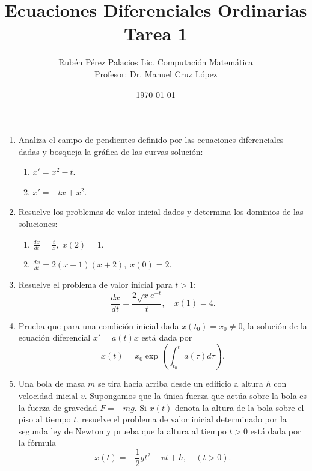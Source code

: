 \documentclass[letterpaper]{article}
\title{Ecuaciones Diferenciales Ordinarias \\ Tarea 1}
\author{Rubén Pérez Palacios Lic. Computación Matemática\\Profesor: Dr. Manuel Cruz López}
\date{\today}
\theoremstyle{definition}
\theoremstyle{lemathm}
\theoremstyle{lemathm}
\theoremstyle{lemathm}
\theoremstyle{lemademthm}
\newcommand{\1}{\mathbbm{1}}
\begin{document}
	\maketitle

	\begin{enumerate}

		\item Analiza el campo de pendientes definido por las ecuaciones diferenciales dadas y bosqueja la gr\'afica de las curvas soluci\'on:
		
		\begin{enumerate}

			\item $x'=x^2-t$.
			
			\item $x'=-tx+x^2$.
			
		\end{enumerate}
		
		\item Resuelve los problemas de valor inicial dados y determina los dominios de las soluciones:
		
		\begin{enumerate}

			\item $\displaystyle{\frac{dx}{dt}=\frac{t}{x}}, \; x(2)=1$.
			
			\item $\displaystyle{\frac{dx}{dt}=2(x-1)(x+2)}, \; x(0)=2$.
			
		\end{enumerate}
		
		\item Resuelve el problema de valor inicial para $t>1$:
		\[ \frac{dx}{dt} = \frac{2\sqrt{x}e^{-t}}{t},\quad x(1)=4. \]
		
		\item Prueba que para una condici\'on inicial dada $x(t_0)=x_0\neq 0$, la soluci\'on de la ecuaci\'on diferencial $x'=a(t)x$ est\'a dada por
		\[ x(t) = x_0\exp\left( \int_{t_0}^t a(\tau)d\tau \right). \]
		
		
		\item Una bola de masa $m$ se tira hacia arriba desde un edificio a altura $h$ con velocidad inicial $v$. Supongamos que la \'unica fuerza que act\'ua sobre la bola es la fuerza de gravedad $F=-mg$. Si $x(t)$ denota la altura de la bola sobre el piso al tiempo $t$, resuelve el problema de valor inicial determinado por la segunda ley de Newton y prueba que la altura al tiempo $t>0$ est\'a dada por la f\'ormula 
		\[ x(t) = -\frac{1}{2}gt^2 + vt + h, \quad (t>0). \]
		

\end{enumerate}
\end{document}

